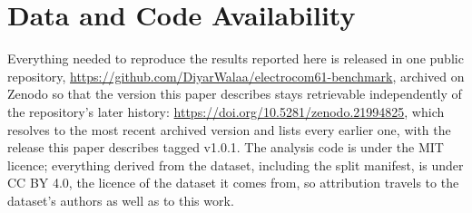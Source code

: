 %

\section{Data and Code Availability}
\label{sec:availability}

Everything needed to reproduce the results reported here is released in one
public repository, \url{https://github.com/DiyarWalaa/electrocom61-benchmark},
archived on Zenodo so that the version this paper describes stays retrievable
independently of the repository's later history:
\url{https://doi.org/10.5281/zenodo.21994825}, which resolves to the most recent
archived version and lists every earlier one, with the release this paper
describes tagged v1.0.1. The
analysis code is under the MIT licence; everything derived from the dataset,
including the split manifest, is under CC BY 4.0, the licence of the dataset it
comes from, so attribution travels to the dataset's authors as well as to this
work.

